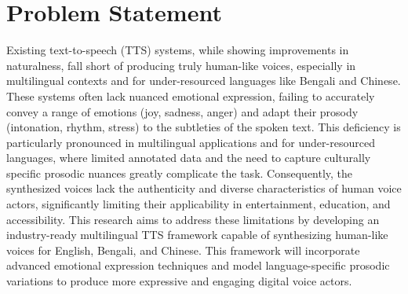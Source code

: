 \section*{Problem Statement}

Existing text-to-speech (TTS) systems, while showing improvements in naturalness, fall short of producing truly human-like voices, especially in multilingual contexts and for under-resourced languages like Bengali and Chinese. These systems often lack nuanced emotional expression, failing to accurately convey a range of emotions (joy, sadness, anger) and adapt their prosody (intonation, rhythm, stress) to the subtleties of the spoken text. This deficiency is particularly pronounced in multilingual applications and for under-resourced languages, where limited annotated data and the need to capture culturally specific prosodic nuances greatly complicate the task. Consequently, the synthesized voices lack the authenticity and diverse characteristics of human voice actors, significantly limiting their applicability in entertainment, education, and accessibility. This research aims to address these limitations by developing an industry-ready multilingual TTS framework capable of synthesizing human-like voices for English, Bengali, and Chinese. This framework will incorporate advanced emotional expression techniques and model language-specific prosodic variations to produce more expressive and engaging digital voice actors.